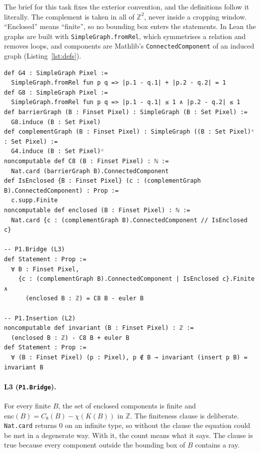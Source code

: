 \documentclass[11pt]{article}
\theoremstyle{definition}
\theoremstyle{remark}
\begin{document}
The brief for this task fixes the exterior convention, and the definitions follow
it literally. The complement is taken in all of $\mathbb{Z}^2$, never inside a
cropping window. ``Enclosed'' means ``finite'', so no bounding box enters the
statements. In Lean the graphs are built with \texttt{SimpleGraph.fromRel},
which symmetrises a relation and removes loops, and components are Mathlib's
\texttt{ConnectedComponent} of an induced graph
(Listing~\ref{lst:defs}).

\begin{lstlisting}[caption={Definitions and the two proposed statements (each Statement lives in its own module).},label={lst:defs}]
def G4 : SimpleGraph Pixel :=
  SimpleGraph.fromRel fun p q => |p.1 - q.1| + |p.2 - q.2| = 1
def G8 : SimpleGraph Pixel :=
  SimpleGraph.fromRel fun p q => |p.1 - q.1| ≤ 1 ∧ |p.2 - q.2| ≤ 1
def barrierGraph (B : Finset Pixel) : SimpleGraph (B : Set Pixel) :=
  G8.induce (B : Set Pixel)
def complementGraph (B : Finset Pixel) : SimpleGraph ((B : Set Pixel)ᶜ : Set Pixel) :=
  G4.induce (B : Set Pixel)ᶜ
noncomputable def C8 (B : Finset Pixel) : ℕ :=
  Nat.card (barrierGraph B).ConnectedComponent
def IsEnclosed {B : Finset Pixel} (c : (complementGraph B).ConnectedComponent) : Prop :=
  c.supp.Finite
noncomputable def enclosed (B : Finset Pixel) : ℕ :=
  Nat.card {c : (complementGraph B).ConnectedComponent // IsEnclosed c}

-- P1.Bridge (L3)
def Statement : Prop :=
  ∀ B : Finset Pixel,
    {c : (complementGraph B).ConnectedComponent | IsEnclosed c}.Finite ∧
      (enclosed B : ℤ) = C8 B - euler B

-- P1.Insertion (L2)
noncomputable def invariant (B : Finset Pixel) : ℤ :=
  (enclosed B : ℤ) - C8 B + euler B
def Statement : Prop :=
  ∀ (B : Finset Pixel) (p : Pixel), p ∉ B → invariant (insert p B) = invariant B
\end{lstlisting}

\paragraph{L3 (\texttt{P1.Bridge}).} For every finite $B$, the set of enclosed
components is finite and $\mathrm{enc}(B) = C_8(B)-\chi(K(B))$ in $\mathbb{Z}$.
The finiteness clause is deliberate. \texttt{Nat.card} returns $0$ on an
infinite type, so without the clause the equation could be met in a degenerate
way. With it, the count means what it says. The clause is true because every
component outside the bounding box of $B$ contains a ray.
\end{document}
